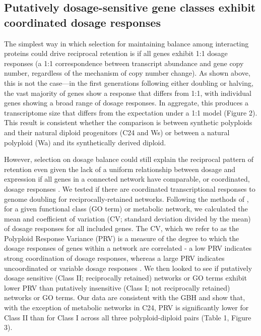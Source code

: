 \documentclass[11pt]{article}
\begin{document}
\subsection*{Putatively dosage-sensitive gene classes exhibit coordinated dosage responses}

The simplest way in which selection for maintaining balance among interacting proteins could drive reciprocal retention is if all genes exhibit 1:1 dosage responses (a 1:1 correspondence between transcript abundance and gene copy number, regardless of the mechanism of copy number change). As shown above, this is not the case---in the first generations following either doubling or halving, the vast majority of genes show a response that differs from 1:1, with individual genes showing a broad range of dosage responses. In aggregate, this produces a transcriptome size that differs from the expectation under a 1:1 model (Figure 2). This result is consistent whether the comparison is between synthetic polyploids and their natural diploid progenitors (C24 and Ws)  or between a natural polyploid (Wa) and its synthetically derived diploid.
 
However, selection on dosage balance could still explain the reciprocal pattern of retention even given the lack of a uniform relationship between dosage and expression if all genes in a connected network have comparable, or coordinated, dosage responses \citep{coate2016}.  We tested if there are coordinated transcriptional responses to genome doubling for reciprocally-retained networks. Following the methods of \cite{coate2016}, for a given functional class (GO term) or metabolic network, we calculated the mean and coefficient of variation (CV; standard deviation divided by the mean) of dosage responses for all included genes. The CV, which we refer to as the Polyploid Response Variance (PRV) is a measure of the degree to which the dosage responses of genes within a network are correlated - a low PRV indicates strong coordination of dosage responses, whereas a large PRV indicates uncoordinated or variable dosage responses \citep{coate2016}. We then looked to see if putatively dosage sensitive (Class II; reciprocally retained) networks or GO terms exhibit lower PRV than putatively insensitive (Class I; not reciprocally retained) networks or GO terms.
Our data are consistent with the GBH and show that, with the exception of metabolic networks in C24, PRV is significantly lower for Class II than for Class I across all three polyploid-diploid pairs (Table 1, Figure 3).
\end{document}

